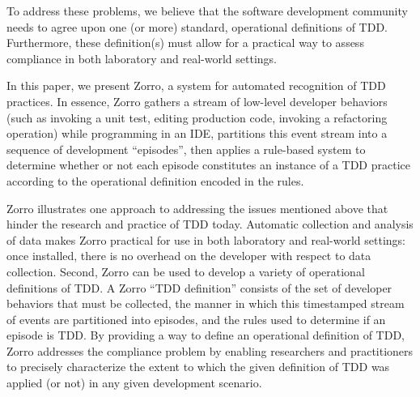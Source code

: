 \documentclass[smallextended]{svjour3}     %
\begin{document}


To address these problems, we believe that the software development
community needs to agree upon one (or more) standard, operational
definitions of TDD. Furthermore, these definition(s) must allow for a
practical way to assess compliance in both laboratory and real-world
settings.

In this paper, we present Zorro, a system for automated recognition of TDD
practices.  In essence, Zorro gathers a stream of low-level developer
behaviors (such as invoking a unit test, editing production code, invoking
a refactoring operation) while programming in an IDE, partitions this event
stream into a sequence of development ``episodes'', then applies a
rule-based system to determine whether or not each episode constitutes an
instance of a TDD practice according to the operational definition encoded in the rules.

Zorro illustrates one approach to addressing the issues mentioned above
that hinder the research and practice of TDD today.  Automatic collection
and analysis of data makes Zorro practical for use in both laboratory and
real-world settings: once installed, there is no overhead on the developer
with respect to data collection.  Second, Zorro can be used to develop a
variety of operational definitions of TDD. A Zorro ``TDD definition''
consists of the set of developer behaviors that must be collected, the
manner in which this timestamped stream of events are partitioned into
episodes, and the rules used to determine if an episode is TDD.  By
providing a way to define an operational definition of TDD, Zorro addresses
the compliance problem by enabling researchers and practitioners to
precisely characterize the extent to which the given definition of TDD was
applied (or not) in any given development scenario.
\end{document}

